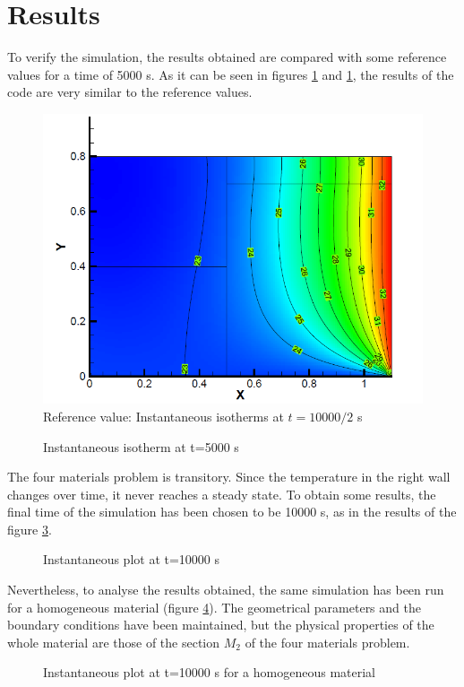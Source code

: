 \section{Results}
To verify the simulation, the results obtained are compared with some reference values for a time of 5000 s. As it can be seen in figures \ref{ref4M} and \ref{ref4M}, the results of the code are very similar to the reference values.
\begin{figure}[h!]
	\centering
	\includegraphics[scale=0.55]{FourMaterials/reference}
	\caption{Reference value: Instantaneous isotherms at $t=10000/2$ s}
	\label{ref4M}
\end{figure}
\begin{figure}[h!]
	\centering
	
	\caption{Instantaneous isotherm at t=5000 s}
	\label{plot4M}
\end{figure}

The four materials problem is transitory. Since the temperature in the right wall changes over time, it never reaches a steady state. To obtain some results, the final time of the simulation has been chosen to be 10000 s, as in the results of the figure \ref{4Mfinal}.
\begin{figure}[h]
	\centering
	
	\caption{Instantaneous plot at t=10000 s}
	\label{4Mfinal}
\end{figure}

Nevertheless, to analyse the results obtained, the same simulation has been run for a homogeneous material (figure \ref{HomoM2}). The geometrical parameters and the boundary conditions have been maintained, but the physical properties of the whole material are those of the section $M_{2}$ of the four materials problem.
\begin{figure}[h]
	\centering
	
	\caption{Instantaneous plot at t=10000 s for a homogeneous material}
	\label{HomoM2}
\end{figure}

